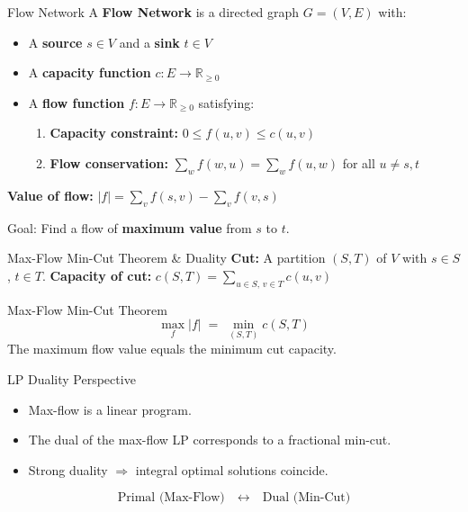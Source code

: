 \documentclass{beamer}
\begin{document}
\begin{frame}{Flow Network}
A \textcolor{new_turquoise}{\bf Flow Network} is a directed graph \( G = (V, E) \) with:
\begin{itemize}

\item A \textbf{source} \( s \in V \) and a \textbf{sink} \( t \in V \)
    \item A \textbf{capacity function} \( c : E \to \mathbb{R}_{\geq 0} \)
    \item A \textbf{flow function} \( f : E \to \mathbb{R}_{\geq 0} \) satisfying:
    \begin{enumerate}
        \item \textbf{Capacity constraint: } \( 0 \leq f(u,v) \leq c(u,v) \)
        \item \textbf{Flow conservation: } \( \sum_{w} f(w,u) = \sum_{w} f(u,w) \) for all \( u \neq s,t \)
    \end{enumerate}
\end{itemize}
\textbf{Value of flow: } \( |f| = \sum_{v} f(s,v) - \sum_{v} f(v,s) \)

\vspace{0.5em}
	Goal: Find a flow of {\bf maximum value} from \( s \) to \( t \).
\end{frame}


\begin{frame}{Max-Flow Min-Cut Theorem \& Duality}
\textbf{Cut:} A partition \( (S, T) \) of \( V \) with \( s \in S \), \( t \in T \).  
\textbf{Capacity of cut: } \( c(S,T) = \sum_{u \in S,\, v \in T} c(u,v) \)

\begin{block}{\textcolor{new_turquoise}{Max-Flow Min-Cut Theorem}}
\[
\max_{f} |f| \;=\; \min_{(S,T)} c(S,T)
\]
The maximum flow value equals the minimum cut capacity.
\end{block}

\begin{block}{\textcolor{new_turquoise}{LP Duality Perspective}}
\begin{itemize}

\item Max-flow is a linear program.
    \item The dual of the max-flow LP corresponds to a fractional min-cut.
    \item Strong duality \(\Rightarrow\) integral optimal solutions coincide.
    
\end{itemize}
\end{block}

\[
\text{Primal (Max-Flow)} \quad \leftrightarrow \quad \text{Dual (Min-Cut)}
\]
\end{frame}
\end{document}
